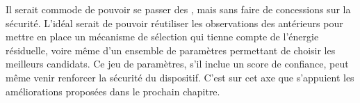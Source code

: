 Il serait commode de pouvoir se passer des \vns, mais sans faire de concessions sur la sécurité.
L'idéal serait de pouvoir réutiliser les observations des \cns antérieurs pour mettre en place un mécanisme de sélection qui tienne compte de l'énergie résiduelle, voire même d'un ensemble de paramètres permettant de choisir les meilleurs candidats.
Ce jeu de paramètres, s'il inclue un score de confiance, peut même venir renforcer la sécurité du dispositif.
C'est sur cet axe que s'appuient les améliorations proposées dans le prochain chapitre.

